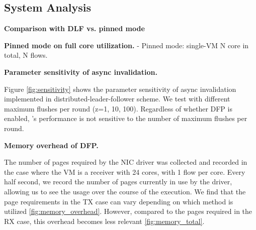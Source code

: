 \subsection{System Analysis}

\textbf{Comparison with DLF vs. pinned mode}

\textbf{Pinned mode on full core utilization.}
- Pinned mode: single-VM N core in total, N flows. 

\textbf{Parameter sensitivity of async invalidation.}


Figure \ref{fig:sensitivity} shows the parameter sensitivity of async invalidation implemented in distributed-leader-follower scheme.
We test with different maximum flushes per round (z=1, 10, 100).
Regardless of whether DFP is enabled, \brand's performance is not sensitive to the number of maximum flushes per round.

\textbf{Memory overhead of DFP.}

The number of pages required by the NIC driver was collected and recorded in the case where the VM is a receiver with 24 cores, with 1 flow per core. Every half second, we record the number of pages currently in use by the driver, allowing us to see the usage over the course of the execution. We find that the page requirements in the TX case can vary depending on which method is utilized \ref{fig:memory_overhead}. However, compared to the pages required in the RX case, this overhead becomes less relevant \ref{fig:memory_total}.

\clearpage


